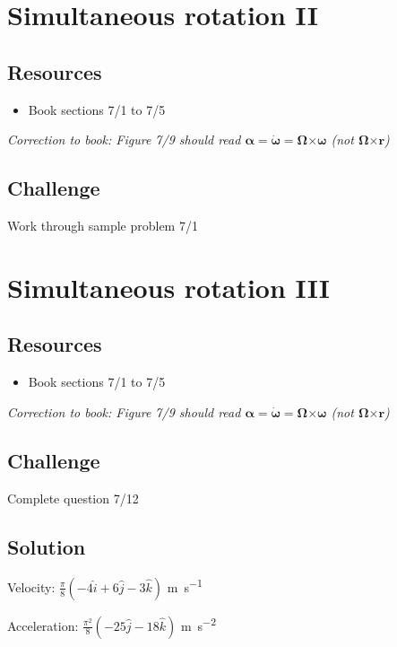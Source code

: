 \newpage
\section{Simultaneous rotation II}

\subsection*{Resources}
\begin{itemize}
    \item Book sections 7/1 to 7/5
\end{itemize}

\emph{Correction to book: Figure 7/9 should read $\bm{\alpha} = \bm{\dot{\omega}} = \bm{\Omega} \bm{\times} \bm{\omega}$ (not $\bm{\Omega} \bm{\times} \bm{r}$)}

\subsection*{Challenge}
Work through sample problem 7/1




\newpage
\section{Simultaneous rotation III}

\subsection*{Resources}
\begin{itemize}
    \item Book sections 7/1 to 7/5
\end{itemize}

\emph{Correction to book: Figure 7/9 should read $\bm{\alpha} = \bm{\dot{\omega}} = \bm{\Omega} \bm{\times} \bm{\omega}$ (not $\bm{\Omega} \bm{\times} \bm{r}$)}

\subsection*{Challenge}
Complete question 7/12


\subsection*{Solution}
Velocity: $\frac{\pi}{8}(-4 \hat{i} + 6 \hat{j} - 3 \hat{k})$ \si{\meter\per\second}

Acceleration: $\frac{\pi^2}{8}(-25 \hat{j} - 18 \hat{k})$ \si{\meter\per\square\second}




